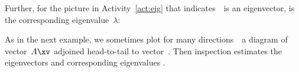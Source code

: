 \begin{activity}
%
%
%
\end{activity}


\begin{activity}
Further, for the picture in Activity~\ref{act:eig} that indicates~\xv\ is an eigenvector, is the corresponding eigenvalue~\(\lambda\):
\end{activity}


As in the next example, we sometimes plot for many directions~\xv\ a diagram of vector~\(A\xv\) adjoined head-to-tail to vector~\xv.
Then inspection estimates the eigenvectors and corresponding eigenvalues \cite[]{Schonefeld1995}.

